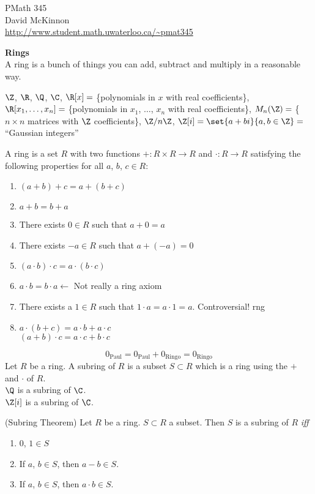 PMath 345 \\
David McKinnon \\
\url{http://www.student.math.uwaterloo.ca/~pmat345}

\textbf{Rings} \\
A ring is a bunch of things you can add, subtract and multiply in a reasonable way.

\eg $\Z$, $\R$, $\Q$, $\C$, $\R[x]={}$\{polynomials in $x$ with real coefficients\}, $\R[x_1,\dotsc,x_n]={}$\{polynomials in $x_1$, $\dotsc$, $x_n$ with real coefficients\}, $M_n(\Z)={}$\{$n\times n$ matrices with $\Z$ coefficients\}, $\Z/n\Z$, $\Z[i]=\set{a+bi}{a,b\in\Z}={}$``Gaussian integers''

 A ring is a set $R$ with two functions ${+}\colon R\times R\to R$ and ${\cdot}\colon R\to R$ satisfying the following properties for all $a$, $b$, $c\in R$:
\begin{enumerate}[label=(\arabic*)]
\item $(a+b)+c=a+(b+c)$
\item $a+b=b+a$
\item There exists $0\in R$ such that $a+0=a$
\item There exists $-a\in R$ such that $a+(-a)=0$
\item $(a\cdot b)\cdot c=a\cdot(b\cdot c)$
\item $a\cdot b=b\cdot a$\quad$\leftarrow$ Not really a ring axiom
\item There exists a $1\in R$ such that $1\cdot a=a\cdot 1=a$.  Controversial!  rng
\item $a\cdot(b+c)=a\cdot b+a\cdot c$ \\
$(a+b)\cdot c=a\cdot c+b\cdot c$
\end{enumerate}%
\[ 0_\text{Paul} = 0_\text{Paul} + 0_\text{Ringo} = 0_\text{Ringo} \]
 Let $R$ be a ring.  A subring of $R$ is a subset $S\subset R$ which is a ring using the $+$ and $\cdot$ of $R$. \\
\eg $\Q$ is a subring of $\C$. \\
$\Z[i]$ is a subring of $\C$.

\thm (Subring Theorem) Let $R$ be a ring.  $S\subset R$ a subset.  Then $S$ is a subring of $R$ \emph{iff}
\begin{enumerate}[label=(\arabic*)]
\item $0$, $1\in S$
\item If $a$, $b\in S$, then $a-b\in S$.
\item If $a$, $b\in S$, then $a\cdot b\in S$.
\end{enumerate}
